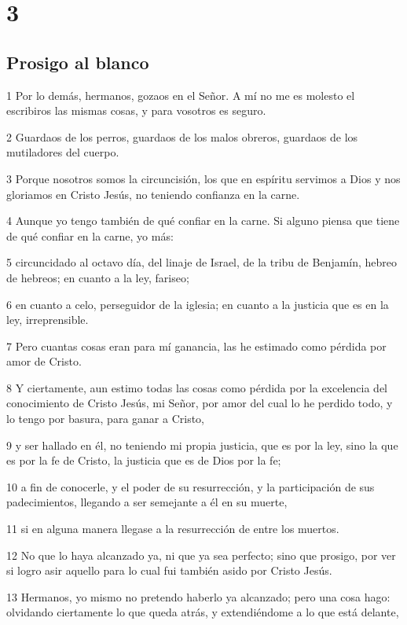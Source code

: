 \chapter{3}

\section*{Prosigo al blanco}

\par 1 Por lo demás, hermanos, gozaos en el Señor. A mí no me es molesto el escribiros las mismas cosas, y para vosotros es seguro.
\par 2 Guardaos de los perros, guardaos de los malos obreros, guardaos de los mutiladores del cuerpo.
\par 3 Porque nosotros somos la circuncisión, los que en espíritu servimos a Dios y nos gloriamos en Cristo Jesús, no teniendo confianza en la carne.
\par 4 Aunque yo tengo también de qué confiar en la carne. Si alguno piensa que tiene de qué confiar en la carne, yo más:
\par 5 circuncidado al octavo día, del linaje de Israel, de la tribu de Benjamín, hebreo de hebreos; en cuanto a la ley, fariseo;
\par 6 en cuanto a celo, perseguidor de la iglesia; en cuanto a la justicia que es en la ley, irreprensible.
\par 7 Pero cuantas cosas eran para mí ganancia, las he estimado como pérdida por amor de Cristo.
\par 8 Y ciertamente, aun estimo todas las cosas como pérdida por la excelencia del conocimiento de Cristo Jesús, mi Señor, por amor del cual lo he perdido todo, y lo tengo por basura, para ganar a Cristo,
\par 9 y ser hallado en él, no teniendo mi propia justicia, que es por la ley, sino la que es por la fe de Cristo, la justicia que es de Dios por la fe;
\par 10 a fin de conocerle, y el poder de su resurrección, y la participación de sus padecimientos, llegando a ser semejante a él en su muerte,
\par 11 si en alguna manera llegase a la resurrección de entre los muertos.
\par 12 No que lo haya alcanzado ya, ni que ya sea perfecto; sino que prosigo, por ver si logro asir aquello para lo cual fui también asido por Cristo Jesús.
\par 13 Hermanos, yo mismo no pretendo haberlo ya alcanzado; pero una cosa hago: olvidando ciertamente lo que queda atrás, y extendiéndome a lo que está delante,
